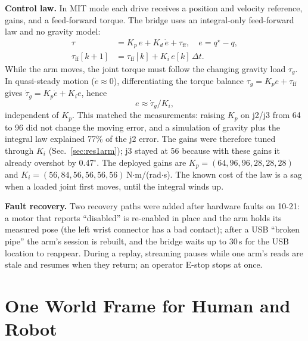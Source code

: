 \documentclass[conference,10pt]{IEEEtran}
\begin{document}
\textbf{Control law.} In MIT mode each drive receives a position and velocity reference, gains, and a feed-forward torque.
The bridge uses an integral-only feed-forward law and no gravity model:
\begin{align}
\tau&=K_p\,e+K_d\,\dot e+\tau_\mathrm{ff},\quad e=q^\star-q,\\
\tau_\mathrm{ff}[k+1]&=\tau_\mathrm{ff}[k]+K_i\,e[k]\,\Delta t .
\end{align}
While the arm moves, the joint torque must follow the changing gravity load $\tau_g$. In quasi-steady motion
($\dot e\approx0$), differentiating the torque balance $\tau_g=K_p e+\tau_\mathrm{ff}$ gives $\dot\tau_g=K_p\dot e+K_i e$,
hence
\begin{equation}
e\approx\dot\tau_g/K_i,
\end{equation}
independent of $K_p$. This matched the measurements: raising $K_p$ on j2/j3 from 64 to 96 did not change the moving error,
and a simulation of gravity plus the integral law explained 77\% of the j2 error. The gains were therefore tuned through
$K_i$ (Sec.~\ref{sec:res1arm}); j3 stayed at 56 because with these gains it already overshot by 0.47$^\circ$. The
deployed gains are $K_p=(64,96,96,28,28,28)$ and $K_i=(56,84,56,56,56,56)$\,N$\cdot$m/(rad$\cdot$s). The known cost of the
law is a sag when a loaded joint first moves, until the integral winds up.

\textbf{Fault recovery.} Two recovery paths were added after hardware faults on 10-21: a motor that reports ``disabled''
is re-enabled in place and the arm holds its measured pose (the left wrist connector has a bad contact); after a USB
``broken pipe'' the arm's session is rebuilt, and the bridge waits up to 30\,s for the USB location to reappear. During a
replay, streaming pauses while one arm's reads are stale and resumes when they return; an operator E-stop stops at once.

\section{One World Frame for Human and Robot}\label{sec:cal}
\end{document}
